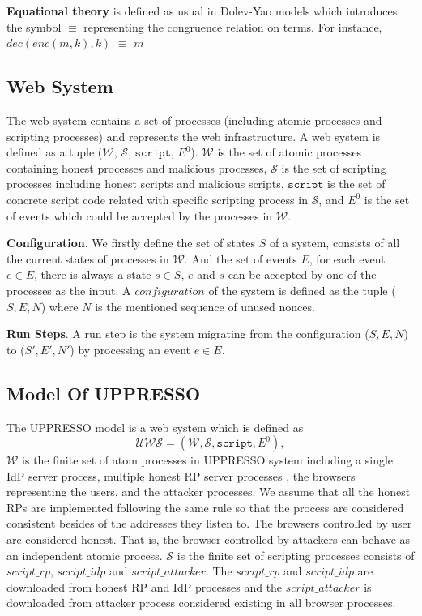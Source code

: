 \vspace{1mm}\noindent\textbf{Equational theory } is defined as usual in Dolev-Yao models which introduces the symbol $\equiv$ representing the congruence relation on terms. For instance,  $dec(enc(m, k), k)$ $\equiv$ $m$


\subsection{Web System}
The web system contains a set of processes (including atomic processes and scripting processes) and represents the web infrastructure. A web system is defined as a tuple ($\mathcal{W}$, $\mathcal{S}$, $\mathtt{script}$, $E^0$). $\mathcal{W}$ is the set of atomic processes containing honest processes and malicious processes, $\mathcal{S}$ is the set of scripting processes including honest scripts and malicious scripts, $\mathtt{script}$ is the set of concrete script code related with specific scripting process in $\mathcal{S}$, and $E^0$ is the set of events which could be accepted by the processes in $\mathcal{W}$. 

\vspace{1mm}\noindent\textbf{Configuration}. 
We firstly define the set of states $S$ of a system, consists of all  the current states of  processes in $\mathcal{W}$. And the set of events $E$, for each event $e \in E$, there is always a state $s \in S$, $e$ and $s$ can be accepted by one of the processes as the input. A $configuration$ of the system is defined as the tuple ($S, E, N$) where $N$ is the mentioned sequence of unused nonces. 

\vspace{1mm}\noindent\textbf{Run Steps}. A run step is the system migrating from the configuration ($S, E, N$) to ($S', E', N'$) by processing an event $e \in E$. 

\subsection{Model Of UPPRESSO}
The UPPRESSO model is a web system which is defined as 
\begin{equation*}
    \mathcal{UWS} = (\mathcal{W}, \mathcal{S}, \mathtt{script}, E^0),
\end{equation*}
$\mathcal{W}$ is the finite set of atom processes in UPPRESSO system including a single IdP server process, multiple honest RP server processes , the browsers representing the users, and the attacker processes. We assume that all the honest RPs are implemented following the same rule so that the  process are considered consistent besides of the addresses they listen to. The browsers controlled by user are considered honest. That is, the browser controlled by attackers can behave as  an independent atomic process.
$\mathcal{S}$ is the finite set of scripting processes consists of $script\_rp$, $script\_idp$ and $script\_attacker$. The $script\_rp$ and $script\_idp$ are downloaded from honest RP and IdP processes and the $script\_attacker$ is downloaded from attacker process considered existing in all browser processes. 

